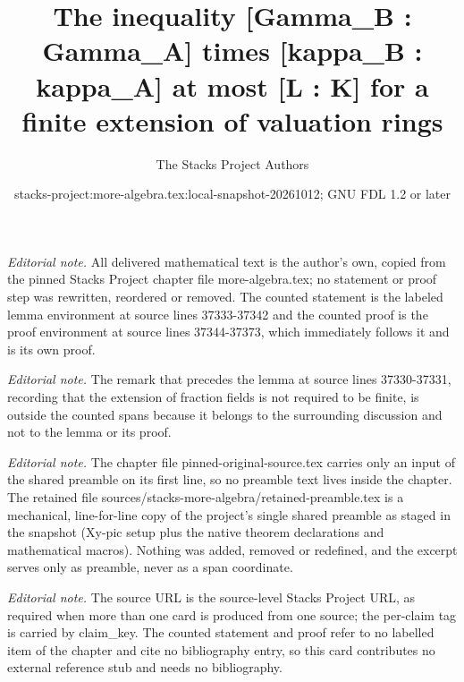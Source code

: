 \documentclass[10pt,a4paper]{amsart}
\title{The inequality [Gamma\_B : Gamma\_A] times [kappa\_B : kappa\_A] at most [L : K] for a finite extension of valuation rings}
\author{The Stacks Project Authors}
\date{stacks-project:more-algebra.tex:local-snapshot-20261012; GNU FDL 1.2 or later}
\theoremstyle{plain}
\theoremstyle{definition}
\theoremstyle{remark}
\numberwithin{equation}{subsection}
\begin{document}
\maketitle
\setcounter{subsection}{1}
\noindent\textit{Editorial note.} All delivered mathematical text is the author's own, copied from the pinned Stacks Project chapter file more-algebra.tex; no statement or proof step was rewritten, reordered or removed. The counted statement is the labeled lemma environment at source lines 37333-37342 and the counted proof is the proof environment at source lines 37344-37373, which immediately follows it and is its own proof.\par\medskip
\noindent\textit{Editorial note.} The remark that precedes the lemma at source lines 37330-37331, recording that the extension of fraction fields is not required to be finite, is outside the counted spans because it belongs to the surrounding discussion and not to the lemma or its proof.\par\medskip
\noindent\textit{Editorial note.} The chapter file pinned-original-source.tex carries only an input of the shared preamble on its first line, so no preamble text lives inside the chapter. The retained file sources/stacks-more-algebra/retained-preamble.tex is a mechanical, line-for-line copy of the project's single shared preamble as staged in the snapshot (Xy-pic setup plus the native theorem declarations and mathematical macros). Nothing was added, removed or redefined, and the excerpt serves only as preamble, never as a span coordinate.\par\medskip
\noindent\textit{Editorial note.} The source URL is the source-level Stacks Project URL, as required when more than one card is produced from one source; the per-claim tag is carried by claim\_key. The counted statement and proof refer to no labelled item of the chapter and cite no bibliography entry, so this card contributes no external reference stub and needs no bibliography.\par\medskip
\end{document}
